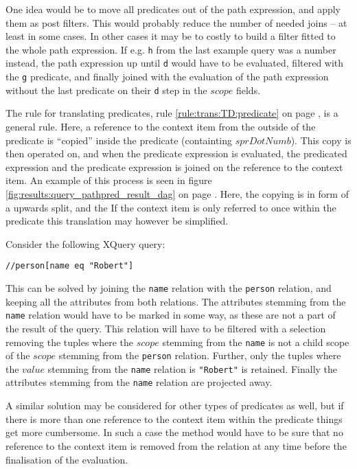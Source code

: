 One idea would be to move all predicates out of the path expression, and apply them as post filters. This would
probably reduce the number of needed joins -- at least in some cases. In other cases it may be to costly to build
a filter fitted to the whole path expression. If e.g. \texttt{h} from the last example query was a number instead,
the path expression up until \texttt{d} would have to be evaluated, filtered with the \texttt{g} predicate, and
finally joined with the evaluation of the path expression without the last predicate on their \texttt{d} step in
the $scope$ fields.

The rule for translating predicates, rule \ref{rule:trans:TD:predicate} on page \pageref{rule:trans:TD:predicate},
is a general rule. Here, a reference to the context item from the outside of the predicate is ``copied'' inside the
predicate (containting $sprDotNumb$). This copy is then operated on, and when the predicate expression is
evaluated, the predicated expression and the predicate expression is joined on the reference to the context item.
An example of this process is seen in figure \ref{fig:results:query_pathpred_result_dag} on page
\pageref{fig:results:query_pathpred_result_dag}. Here, the copying is in form of a upwards split, and the If the
context item is only referred to once within the predicate this translation may however be simplified.

Consider the following XQuery query:
\begin{center}
\texttt{//person[name eq "Robert"]}
\end{center}

This can be solved by joining the \texttt{name} relation with the \texttt{person} relation, and keeping all the
attributes from both relations. The attributes stemming from the \texttt{name} relation would have to be marked in
some way, as these are not a part of the result of the query. This relation will have to be filtered with a
selection removing the tuples where the $scope$ stemming from the \texttt{name} is not a child scope of the
$scope$ stemming from the \texttt{person} relation. Further, only the tuples where the $value$ stemming from the
\texttt{name} relation is \texttt{"Robert"} is retained. Finally the attributes stemming from the \texttt{name}
relation are projected away.

A similar solution may be considered for other types of predicates as well, but if there is more than one
reference to the context item within the predicate things get more cumbersome. In such a case the method would
have to be sure that no reference to the context item is removed from the relation at any time before the
finalisation of the evaluation.